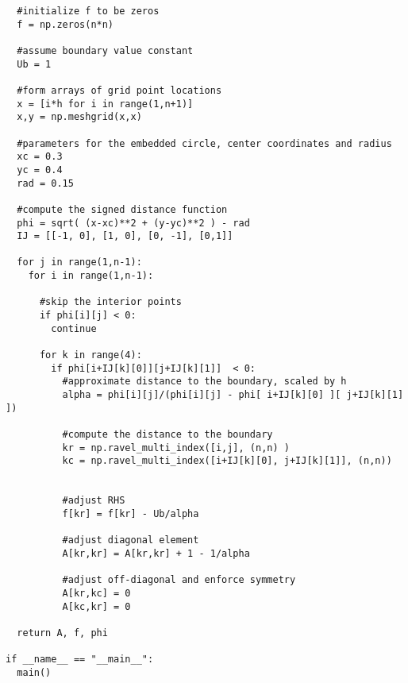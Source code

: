 \documentclass[12pt]{article}
\begin{document}
\begin{verbatim}
  #initialize f to be zeros
  f = np.zeros(n*n)

  #assume boundary value constant
  Ub = 1

  #form arrays of grid point locations
  x = [i*h for i in range(1,n+1)]
  x,y = np.meshgrid(x,x)

  #parameters for the embedded circle, center coordinates and radius
  xc = 0.3
  yc = 0.4
  rad = 0.15

  #compute the signed distance function
  phi = sqrt( (x-xc)**2 + (y-yc)**2 ) - rad
  IJ = [[-1, 0], [1, 0], [0, -1], [0,1]]

  for j in range(1,n-1):
    for i in range(1,n-1):

      #skip the interior points
      if phi[i][j] < 0:
        continue

      for k in range(4):
        if phi[i+IJ[k][0]][j+IJ[k][1]]  < 0:
          #approximate distance to the boundary, scaled by h
          alpha = phi[i][j]/(phi[i][j] - phi[ i+IJ[k][0] ][ j+IJ[k][1] ])

          #compute the distance to the boundary
          kr = np.ravel_multi_index([i,j], (n,n) )
          kc = np.ravel_multi_index([i+IJ[k][0], j+IJ[k][1]], (n,n))


          #adjust RHS
          f[kr] = f[kr] - Ub/alpha

          #adjust diagonal element
          A[kr,kr] = A[kr,kr] + 1 - 1/alpha

          #adjust off-diagonal and enforce symmetry
          A[kr,kc] = 0
          A[kc,kr] = 0

  return A, f, phi

if __name__ == "__main__":
  main()  
 
\end{verbatim}
\end{document}
